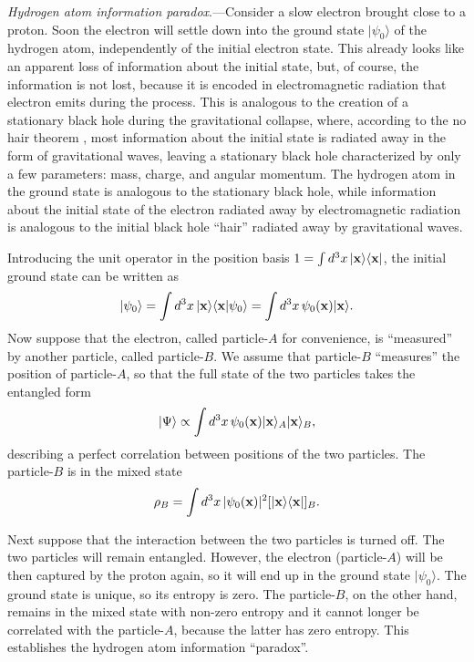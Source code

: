 \documentclass[aps,prd,onecolumn,groupedaddress,showkeys,12pt]{revtex4-2}
\begin{document}
{\it Hydrogen atom information paradox}.---Consider a slow electron brought close to a proton. Soon the electron will
settle down into the ground state $|\psi_0\rangle$ of the hydrogen atom, independently of the initial electron state.
This already looks like an apparent loss of information about the initial state, but, of course, the information is not lost,
because it is encoded in electromagnetic radiation that electron emits during the process. This is analogous 
to the creation of a stationary black hole during the gravitational collapse, where, 
according to the no hair theorem \cite{hawking-ellis,frolov-novikov}, most information about the initial state is radiated away 
in the form of gravitational waves, leaving a stationary black hole characterized by only a few parameters:
mass, charge, and angular momentum. The hydrogen atom in the ground state is analogous to the stationary black hole, 
while information about the initial state of the electron radiated away by electromagnetic radiation
is analogous to the initial black hole ``hair'' radiated away by gravitational waves. 

Introducing the unit operator in the position basis $1=\int d^3x\,|{\bf x}\rangle\langle{\bf x}|$, 
the initial ground state can be written as 
\begin{equation}
 |\psi_0\rangle = \int d^3x\,|{\bf x}\rangle\langle{\bf x}|\psi_0\rangle 
 = \int d^3x\,\psi_0({\bf x}) |{\bf x}\rangle .
\end{equation}
Now suppose that the electron, called particle-$A$ for convenience,
is ``measured'' by another particle, called particle-$B$. We assume that particle-$B$ ``measures'' the position of particle-$A$,
so that the full state of the two particles takes the entangled form
\begin{equation}
 |\Psi\rangle \propto \int d^3x\,\psi_0({\bf x}) |{\bf x}\rangle_A |{\bf x}\rangle_B ,
\end{equation}
describing a perfect correlation between positions of the two particles.
The particle-$B$ is in the mixed state
\begin{equation}
 \rho_B=\int d^3x\,|\psi_0({\bf x})|^2 [|{\bf x}\rangle \langle{\bf x}|]_B .
\end{equation}

Next suppose that the interaction between the two particles is turned off. The two particles will remain entangled.
However, the electron (particle-$A$) will be then captured by the proton again, so it will end up in the ground state
$|\psi_0\rangle$. The ground state is unique, so its entropy is zero. The particle-$B$, on the other hand, remains in the 
mixed state with non-zero entropy and it cannot longer be correlated with the particle-$A$, because the latter has zero entropy. 
This establishes the hydrogen atom information ``paradox''. 
\end{document}
